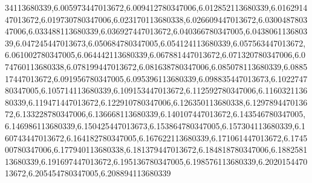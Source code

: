 34113680339,6.005973447013672,6.009412780347006,6.012852113680339,6.016291447013672,6.019730780347006,6.023170113680338,6.026609447013672,6.030048780347006,6.033488113680339,6.036927447013672,6.040366780347005,6.043806113680339,6.047245447013673,6.050684780347005,6.054124113680339,6.057563447013672,6.061002780347005,6.064442113680339,6.067881447013672,6.071320780347006,6.074760113680338,6.078199447013672,6.081638780347006,6.085078113680339,6.088517447013672,6.091956780347005,6.095396113680339,6.098835447013673,6.102274780347005,6.105714113680339,6.109153447013672,6.112592780347006,6.116032113680339,6.119471447013672,6.122910780347006,6.126350113680338,6.129789447013672,6.133228780347006,6.136668113680339,6.140107447013672,6.143546780347005,6.146986113680339,6.150425447013673,6.153864780347005,6.157304113680339,6.160743447013672,6.164182780347005,6.167622113680339,6.171061447013672,6.174500780347006,6.177940113680338,6.181379447013672,6.184818780347006,6.188258113680339,6.191697447013672,6.195136780347005,6.198576113680339,6.202015447013672,6.205454780347005,6.208894113680339
